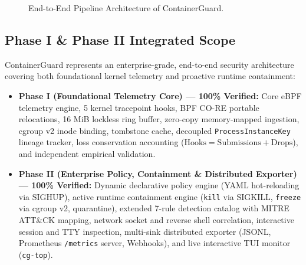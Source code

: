 \documentclass[11pt,a4paper]{article}
\begin{document}
\begin{figure}[htbp]
\caption{End-to-End Pipeline Architecture of ContainerGuard.}
\label{fig:global_arch}
\end{figure}

\subsection{Phase I \& Phase II Integrated Scope}
ContainerGuard represents an enterprise-grade, end-to-end security architecture covering both foundational kernel telemetry and proactive runtime containment:
\begin{itemize}
    \item \textbf{Phase I (Foundational Telemetry Core) --- 100\% Verified:} Core eBPF telemetry engine, 5 kernel tracepoint hooks, BPF CO-RE portable relocations, 16 MiB lockless ring buffer, zero-copy memory-mapped ingestion, cgroup v2 inode binding, tombstone cache, decoupled \texttt{ProcessInstanceKey} lineage tracker, loss conservation accounting ($\text{Hooks} = \text{Submissions} + \text{Drops}$), and independent empirical validation.
    \item \textbf{Phase II (Enterprise Policy, Containment \& Distributed Exporter) --- 100\% Verified:} Dynamic declarative policy engine (YAML hot-reloading via SIGHUP), active runtime containment engine (\texttt{kill} via SIGKILL, \texttt{freeze} via cgroup v2, quarantine), extended 7-rule detection catalog with MITRE ATT\&CK mapping, network socket and reverse shell correlation, interactive session and TTY inspection, multi-sink distributed exporter (JSONL, Prometheus \texttt{/metrics} server, Webhooks), and live interactive TUI monitor (\texttt{cg-top}).
\end{itemize}
\end{document}
